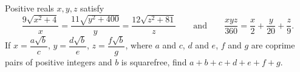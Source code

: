 Positive reals $x,y,z$ satisfy
\[
\dfrac{9\sqrt{x^2+4}}{x}=\dfrac{11\sqrt{y^2+400}}{y}=\dfrac{12\sqrt{z^2+81}}{z}\qquad\text{and}\qquad\dfrac{xyz}{360}=\dfrac {x}{2}+\dfrac{y}{20}+\dfrac {z}{9} .
\]
If $x=\dfrac{a\sqrt b}{c}$, $y=\dfrac{d\sqrt b}{e}$, $z=\dfrac{f\sqrt b}{g}$, where $a$ and $c$, $d$ and $e$, $f$ and $g$ are coprime pairs of positive integers and $b$ is squarefree, find $a+b+c+d+e+f+g$.
